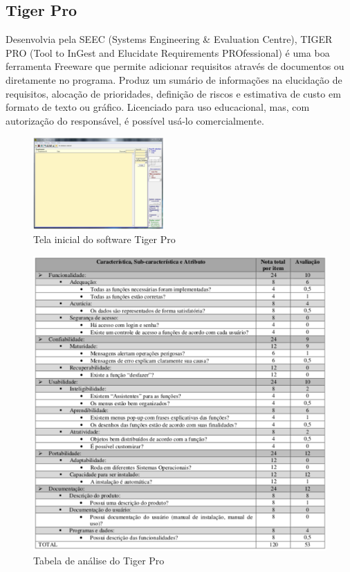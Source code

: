 \subsection{Tiger Pro}

  Desenvolvia pela SEEC (Systems Engineering \& Evaluation Centre), TIGER PRO (Tool to InGest and Elucidate Requirements PROfessional)
  é uma boa ferramenta Freeware que permite adicionar requisitos através de documentos ou diretamente no programa. Produz
  um sumário de informações na elucidação de requisitos, alocação de prioridades, definição de riscos e estimativa de custo em formato
  de texto ou gráfico. Licenciado para uso educacional, mas, com autorização do responsável, é possível usá-lo comercialmente.

  \begin{figure}[!h]
    \centering
    \includegraphics[width=5cm, keepaspectratio=true]{figuras/ferramentas/tiger1.eps}
    \caption{Tela inicial do software Tiger Pro}
  \end{figure}

  \begin{figure}[!h]
    \centering
    \includegraphics[width=12cm, keepaspectratio=true]{figuras/ferramentas/tiger2.eps}
    \caption{Tabela de análise do Tiger Pro}
  \end{figure}

